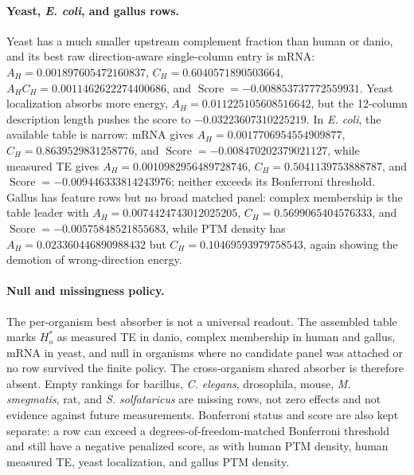 \paragraph{Yeast, \emph{E. coli}, and gallus rows.}
Yeast has a much smaller upstream complement fraction than human or danio, and its best raw direction-aware single-column entry is mRNA: $A_H=0.001897605472160837$, $C_H=0.6040571890503664$, $A_HC_H=0.0011462622274400686$, and $\operatorname{Score}=-0.008853737772559931$.  Yeast localization absorbs more energy, $A_H=0.011225105608516642$, but the 12-column description length pushes the score to $-0.03223607310225219$.  In \emph{E. coli}, the available table is narrow: mRNA gives $A_H=0.0017706954554909877$, $C_H=0.8639529831258776$, and $\operatorname{Score}=-0.008470202379021127$, while measured TE gives $A_H=0.0010982956489728746$, $C_H=0.5041139753888787$, and $\operatorname{Score}=-0.009446333814243976$; neither exceeds its Bonferroni threshold.  Gallus has feature rows but no broad matched panel: complex membership is the table leader with $A_H=0.0074424743012025205$, $C_H=0.5699065404576333$, and $\operatorname{Score}=-0.00575848521855683$, while PTM density has $A_H=0.023360446890988432$ but $C_H=0.10469593979758543$, again showing the demotion of wrong-direction energy.

\paragraph{Null and missingness policy.}
The per-organism best absorber is not a universal readout.  The assembled table marks $H_o^*$ as measured TE in danio, complex membership in human and gallus, mRNA in yeast, and null in organisms where no candidate panel was attached or no row survived the finite policy.  The cross-organism shared absorber is therefore absent.  Empty rankings for bacillus, \emph{C. elegans}, drosophila, mouse, \emph{M. smegmatis}, rat, and \emph{S. solfataricus} are missing rows, not zero effects and not evidence against future measurements.  Bonferroni status and score are also kept separate: a row can exceed a degrees-of-freedom-matched Bonferroni threshold and still have a negative penalized score, as with human PTM density, human measured TE, yeast localization, and gallus PTM density.

